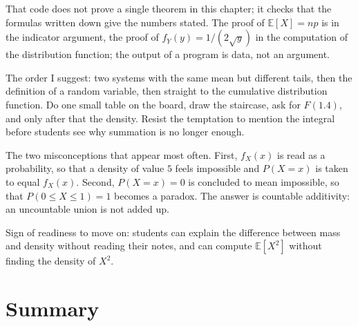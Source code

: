 That code does not prove a single theorem in this chapter; it checks that the formulas
written down give the numbers stated. The proof of $\mathbb{E}[X]=np$ is in the indicator
argument, the proof of $f_Y(y)=1/(2\sqrt y)$ in the computation of the distribution function;
the output of a program is data, not an argument.

\begin{untukdosen}
The order I suggest: two systems with the same mean but different tails, then
the definition of a random variable, then straight to the cumulative distribution function. Do one small
table on the board, draw the staircase, ask for $F(1.4)$, and only after that the density.
Resist the temptation to mention the integral before students see why summation
is no longer enough.

The two misconceptions that appear most often. First, $f_X(x)$ is read as a probability,
so that a density of value $5$ feels impossible and $P(X=x)$ is taken to equal
$f_X(x)$. Second, $P(X=x)=0$ is concluded to mean impossible, so that
$P(0\le X\le1)=1$ becomes a paradox. The answer is countable additivity: an uncountable
union is not added up.

Sign of readiness to move on: students can explain the difference between mass and density without
reading their notes, and can compute $\mathbb{E}[X^2]$ without finding the density of $X^2$.
\end{untukdosen}

\section{Summary}


